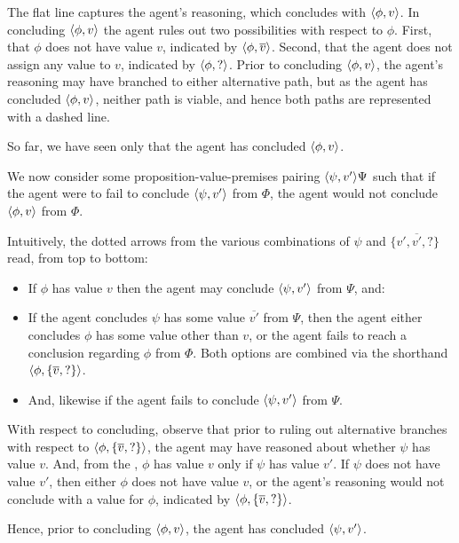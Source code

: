 \begin{note}[Figure]
  The flat line captures the agent's reasoning, which concludes with \(\langle \phi, v \rangle\).
  In concluding \(\langle \phi, v \rangle\) the agent rules out two possibilities with respect to \(\phi\).
  First, that \(\phi\) does not have value \(v\), indicated by \(\langle \phi, \overline{v} \rangle\).
  Second, that the agent does not assign any value to \(v\), indicated by \(\langle \phi, ? \rangle\).
  Prior to concluding \(\langle \phi, v \rangle\), the agent's reasoning may have branched to either alternative path, but as the agent has concluded \(\langle \phi, v \rangle\), neither path is viable, and hence both paths are represented with a dashed line.

  So far, we have seen only that the agent has concluded \(\langle \phi, v \rangle\).

  We now consider some proposition-value-premises pairing \(\langle \psi, v' \rangle{\Psi}\) such that if the agent were to fail to conclude \(\langle \psi, v' \rangle\) from \(\Phi\), the agent would not conclude \(\langle \phi, v \rangle\) from \(\Phi\).

  Intuitively, the dotted arrows from the various combinations of \(\psi\) and \(\{v',\overline{v'},?\}\) read, from top to bottom:
  \begin{itemize}
  \item If \(\phi\) has value \(v\) then the agent may conclude \(\langle \psi, v' \rangle\) from \(\Psi\), and:
  \item If the agent concludes \(\psi\) has some value \(\overline{v'}\) from \(\Psi\), then the agent either concludes \(\phi\) has some value other than \(v\), or the agent fails to reach a conclusion regarding \(\phi\) from \(\Phi\).
    Both options are combined via the shorthand \(\langle \phi, \{\overline{v},?\} \rangle\).
  \item
    And, likewise if the agent fails to conclude \(\langle \psi, v' \rangle\) from \(\Psi\).
  \end{itemize}

  With respect to concluding, observe that prior to ruling out alternative branches with respect to \(\langle \phi, \{\overline{v},?\} \rangle\), the agent may have reasoned about whether \(\psi\) has value \(v\).
  And, from the \agpe{}, \(\phi\) has value \(v\) only if \(\psi\) has value \(v'\).
  If \(\psi\) does not have value \(v'\), then either \(\phi\) does not have value \(v\), or the agent's reasoning would not conclude with a value for \(\phi\), indicated by \(\langle \phi, \{\overline{v},?\} \rangle\).

  Hence, prior to concluding \(\langle \phi, v \rangle\), the agent has concluded \(\langle \psi, v' \rangle\).
\end{note}

